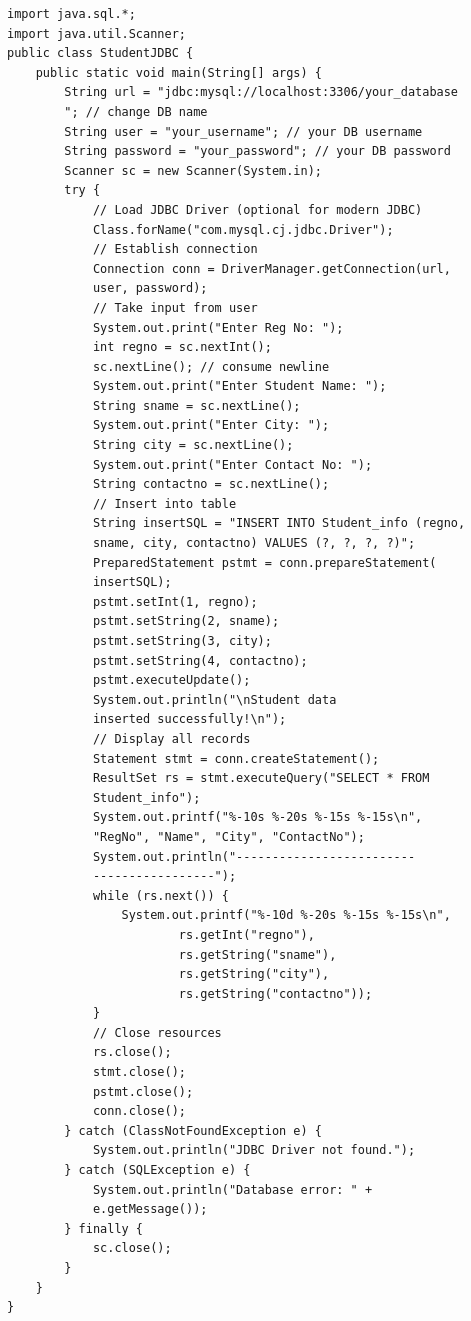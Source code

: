 \begin{verbatim}
import java.sql.*;
import java.util.Scanner;
public class StudentJDBC {
    public static void main(String[] args) {
        String url = "jdbc:mysql://localhost:3306/your_database
        "; // change DB name
        String user = "your_username"; // your DB username
        String password = "your_password"; // your DB password
        Scanner sc = new Scanner(System.in);
        try {
            // Load JDBC Driver (optional for modern JDBC)
            Class.forName("com.mysql.cj.jdbc.Driver");
            // Establish connection
            Connection conn = DriverManager.getConnection(url, 
            user, password);
            // Take input from user
            System.out.print("Enter Reg No: ");
            int regno = sc.nextInt();
            sc.nextLine(); // consume newline
            System.out.print("Enter Student Name: ");
            String sname = sc.nextLine();
            System.out.print("Enter City: ");
            String city = sc.nextLine();
            System.out.print("Enter Contact No: ");
            String contactno = sc.nextLine();
            // Insert into table
            String insertSQL = "INSERT INTO Student_info (regno, 
            sname, city, contactno) VALUES (?, ?, ?, ?)";
            PreparedStatement pstmt = conn.prepareStatement(
            insertSQL);
            pstmt.setInt(1, regno);
            pstmt.setString(2, sname);
            pstmt.setString(3, city);
            pstmt.setString(4, contactno);
            pstmt.executeUpdate();
            System.out.println("\nStudent data 
            inserted successfully!\n");
            // Display all records
            Statement stmt = conn.createStatement();
            ResultSet rs = stmt.executeQuery("SELECT * FROM
            Student_info");
            System.out.printf("%-10s %-20s %-15s %-15s\n",
            "RegNo", "Name", "City", "ContactNo");
            System.out.println("-------------------------
            -----------------");
            while (rs.next()) {
                System.out.printf("%-10d %-20s %-15s %-15s\n",
                        rs.getInt("regno"),
                        rs.getString("sname"),
                        rs.getString("city"),
                        rs.getString("contactno"));
            }
            // Close resources
            rs.close();
            stmt.close();
            pstmt.close();
            conn.close();
        } catch (ClassNotFoundException e) {
            System.out.println("JDBC Driver not found.");
        } catch (SQLException e) {
            System.out.println("Database error: " + 
            e.getMessage());
        } finally {
            sc.close();
        }
    }
}

\end{verbatim}
